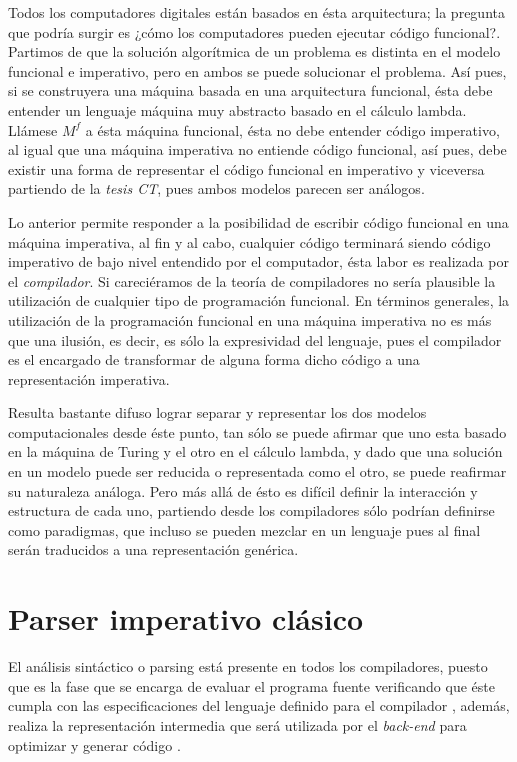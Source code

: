 	Todos los computadores digitales están basados en ésta arquitectura; la pregunta que podría surgir es ¿cómo los computadores pueden ejecutar código funcional?. Partimos de que la solución algorítmica de un problema es distinta en el modelo funcional e imperativo, pero en ambos se puede solucionar el problema. Así pues, si se construyera una máquina basada en una arquitectura funcional, ésta debe entender un lenguaje máquina muy abstracto basado en el cálculo lambda. Llámese $M^f$ a ésta máquina funcional, ésta no debe entender código imperativo, al igual que una máquina imperativa no entiende código funcional, así pues, debe existir una forma de representar el código funcional en imperativo y viceversa partiendo de la \emph{tesis CT}, pues ambos modelos parecen ser análogos.
	
	Lo anterior permite responder a la posibilidad de escribir código funcional en una máquina imperativa, al fin y al cabo, cualquier código terminará siendo código imperativo de bajo nivel entendido por el computador, ésta labor es realizada por el \emph{compilador}. Si careciéramos de la teoría de compiladores no sería plausible la utilización de cualquier tipo de programación funcional. En términos generales, la utilización de la programación funcional en una máquina imperativa no es más que una ilusión, es decir, es sólo la expresividad del lenguaje, pues el compilador es el encargado de transformar de alguna forma dicho código a una representación imperativa.
	
	Resulta bastante difuso lograr separar y representar los dos modelos computacionales desde éste punto, tan sólo se puede afirmar que uno esta basado en la máquina de Turing y el otro en el cálculo lambda, y dado que una solución en un modelo puede ser reducida o representada como el otro, se puede reafirmar su naturaleza análoga. Pero más allá de ésto es difícil definir la interacción y estructura de cada uno, partiendo desde los compiladores sólo podrían definirse como paradigmas, que incluso se pueden mezclar en un lenguaje pues al final serán traducidos a una representación genérica. 
	
	
\section{Parser imperativo clásico}
El análisis sintáctico o parsing está presente en todos los compiladores, puesto que es la fase que se encarga de evaluar el programa fuente verificando que éste cumpla con las especificaciones del lenguaje definido para el compilador \cite{MarioZ}, además, realiza la representación intermedia que será utilizada por el \emph{back-end} para optimizar y generar código \cite{Dragon}.

